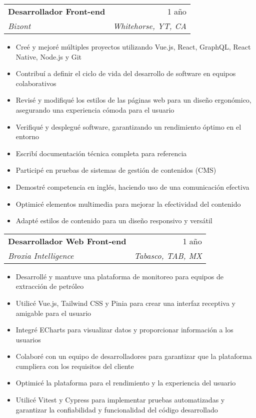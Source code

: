 \documentclass[letterpaper,11pt]{article}
\makeatletter
\newcommand{\resumeItem}[1]{
  \item\small{
    {#1 \vspace{-2pt}}
  }
}
\newcommand{\resumeSubheading}[4]{
  \vspace{-2pt}\item
    \begin{tabular*}{0.97\textwidth}[t]{l@{\extracolsep{\fill}}r}
      \textbf{#1} & #2 \\
      \textit{\small#3} & \textit{\small #4} \\
    \end{tabular*}\vspace{-7pt}
}
\newcommand{\resumeItemListStart}{\begin{itemize}}
\newcommand{\resumeItemListEnd}{\end{itemize}\vspace{-5pt}}
\makeatother
\begin{document}
    \resumeSubheading
      {Desarrollador Front-end}{1 año}
      {Bizont}{Whitehorse, YT, CA}
      \resumeItemListStart
        \resumeItem{Creé y mejoré múltiples proyectos utilizando Vue.js, React, GraphQL, React Native, Node.js y Git}
        \resumeItem{Contribuí a definir el ciclo de vida del desarrollo de software en equipos colaborativos}
        \resumeItem{Revisé y modifiqué los estilos de las páginas web para un diseño ergonómico, asegurando una experiencia cómoda para el usuario}
        \resumeItem{Verifiqué y desplegué software, garantizando un rendimiento óptimo en el entorno}
        \resumeItem{Escribí documentación técnica completa para referencia}
        \resumeItem{Participé en pruebas de sistemas de gestión de contenidos (CMS)}
        \resumeItem{Demostré competencia en inglés, haciendo uso de una comunicación efectiva}
        \resumeItem{Optimicé elementos multimedia para mejorar la efectividad del contenido}
        \resumeItem{Adapté estilos de contenido para un diseño responsivo y versátil}
      \resumeItemListEnd

		\resumeSubheading
			{Desarrollador Web Front-end}{1 año}
			{Broxia Intelligence}{Tabasco, TAB, MX}
			\resumeItemListStart
				\resumeItem{Desarrollé y mantuve una plataforma de monitoreo para equipos de extracción de petróleo}
				\resumeItem{Utilicé Vue.js, Tailwind CSS y Pinia para crear una interfaz receptiva y amigable para el usuario}
				\resumeItem{Integré ECharts para visualizar datos y proporcionar información a los usuarios}
				\resumeItem{Colaboré con un equipo de desarrolladores para garantizar que la plataforma cumpliera con los requisitos del cliente}
				\resumeItem{Optimicé la plataforma para el rendimiento y la experiencia del usuario}
				\resumeItem{Utilicé Vitest y Cypress para implementar pruebas automatizadas y garantizar la confiabilidad y funcionalidad del código desarrollado}
			\resumeItemListEnd
\end{document}
